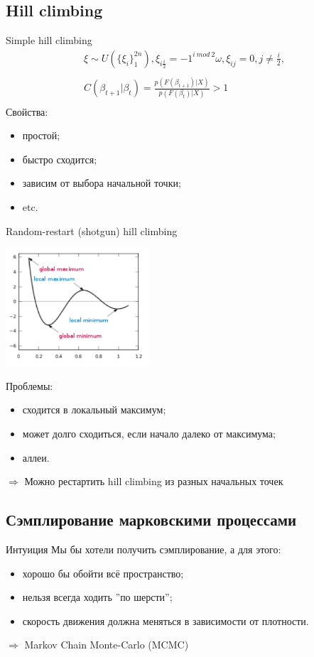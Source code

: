 \documentclass[14pt, fleqn, xcolor={dvipsnames, table}]{beamer}
\begin{document}
\subsection{Hill climbing}
\begin{frame}{Simple hill climbing}
$$\begin{array}{l}
\xi \sim U(\{\xi_i\}_1^{2n}), \xi_{i\frac{i}{2}} = -1^{i~mod~2}\omega, \xi_{ij} = 0, j \neq \frac{i}{2},\\
\\
C(\beta_{t+1}|\beta_t) = \frac{p(F(\beta_{t+1})|X)}{p(F(\beta_t)|X)} > 1 \\
\end{array}$$
Свойства:
\begin{itemize}
  \item простой;
  \item быстро сходится;
  \item зависим от выбора начальной точки;
  \item etc.
\end{itemize}
\end{frame}

\begin{frame}{Random-restart (shotgun) hill climbing}
\begin{center}
\includegraphics[width=0.4\textwidth]{hill_climb.png}
\end{center}
\footnotesize
Проблемы:
\begin{itemize}
  \item сходится в локальный максимум;
  \item может долго сходиться, если начало далеко от максимума;
  \item аллеи.
\end{itemize}
$\Rightarrow$ Можно рестартить hill climbing из разных начальных точек
\end{frame}

\subsection{Сэмплирование марковскими процессами}
\begin{frame}{Интуиция}
Мы бы хотели получить сэмплирование, а для этого:
\begin{itemize}
  \item хорошо бы обойти всё пространство;
  \item нельзя всегда ходить ''по шерсти'';
  \item скорость движения должна меняться в зависимости от плотности.
\end{itemize}
$\Rightarrow$ Markov Chain Monte-Carlo (MCMC)
\end{frame}
\end{document}
